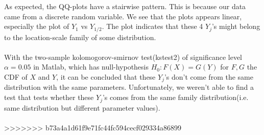 As expected, the QQ-plots have a stairwise pattern. This is because our data came from a discrete random variable. We see that the plots appears linear, especially the plot of $Y_{1}$ vs $Y_{1/2}$. The plot indicates that these 4 $Y_j$'s might belong to the location-scale family of some distribution.\\
\\
With the two-sample kolomogorov-smirnov test(kstest2) of significance level $\alpha=0.05$ in Matlab, which has null-hypothesis $H_0:F(X)=G(Y)$ for $F,G$ the CDF of $X$ and $Y$, it can be concluded that these $Y_j$'s don't come from the same distribution with the same parameters. Unfortunately, we weren't able to find a test that tests whether these $Y_j$'s comes from the same family distribution(i.e. same distribution but different parameter values).\\
\\
>>>>>>> b73a4a1d61f9e71fc44fc594cecf029334a86899
